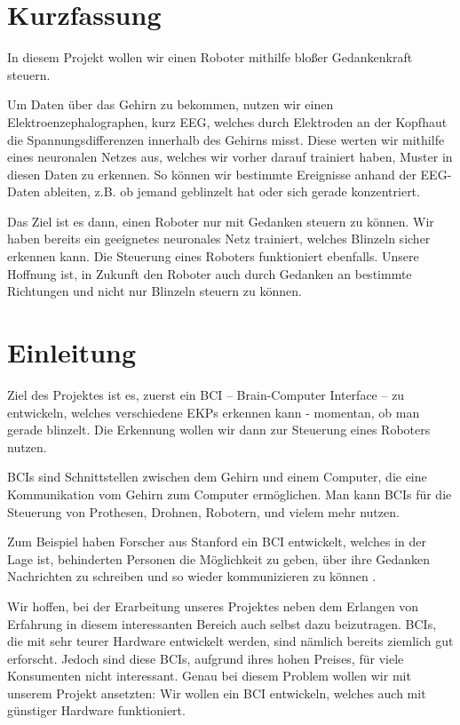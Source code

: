 \documentclass[11pt]{scrartcl}
\begin{document}
	\newpage

	
	\tableofcontents
	
	\newpage

	\section{Kurzfassung}


	In diesem Projekt wollen wir einen Roboter mithilfe bloßer Gedankenkraft steuern.

	Um Daten über das Gehirn zu bekommen, nutzen wir einen Elektroenzephalographen, kurz EEG, welches durch Elektroden an der Kopfhaut die Spannungsdifferenzen innerhalb des Gehirns misst. Diese werten wir mithilfe eines neuronalen Netzes aus, welches wir vorher darauf trainiert haben, Muster in diesen Daten zu erkennen. So können wir bestimmte Ereignisse anhand der EEG-Daten ableiten, z.B. ob jemand geblinzelt hat oder sich gerade konzentriert.
	
	Das Ziel ist es dann, einen Roboter nur mit Gedanken steuern zu können.
	Wir haben bereits ein geeignetes neuronales Netz trainiert, welches Blinzeln sicher erkennen kann. Die Steuerung eines Roboters funktioniert ebenfalls.
	Unsere Hoffnung ist, in Zukunft den Roboter auch durch Gedanken an bestimmte Richtungen und nicht nur Blinzeln steuern zu können.

	\section{Einleitung}

	Ziel des Projektes ist es, zuerst ein BCI -- Brain-Computer Interface -- zu entwickeln, welches verschiedene EKPs erkennen kann - momentan, ob man gerade blinzelt. Die Erkennung wollen wir dann zur Steuerung eines Roboters nutzen.

	BCIs sind Schnittstellen zwischen dem Gehirn und einem Computer, die eine Kommunikation vom Gehirn zum Computer ermöglichen. Man kann BCIs für die Steuerung von Prothesen, Drohnen, Robotern, und vielem mehr nutzen. \cite{bci-explained}

	Zum Beispiel haben Forscher aus Stanford ein BCI entwickelt, welches in der Lage ist, behinderten Personen die Möglichkeit zu geben, über ihre Gedanken Nachrichten zu schreiben und so wieder kommunizieren zu können \cite{brain2text}.
	
	Wir hoffen, bei der Erarbeitung unseres Projektes neben dem Erlangen von Erfahrung in diesem interessanten Bereich auch selbst dazu beizutragen. BCIs, die mit sehr teurer Hardware entwickelt werden, sind nämlich bereits ziemlich gut erforscht. Jedoch sind diese BCIs, aufgrund ihres hohen Preises, für viele Konsumenten nicht interessant. Genau bei diesem Problem wollen wir mit unserem Projekt ansetzten: Wir wollen ein BCI entwickeln, welches auch mit günstiger Hardware funktioniert.
	
\end{document}
